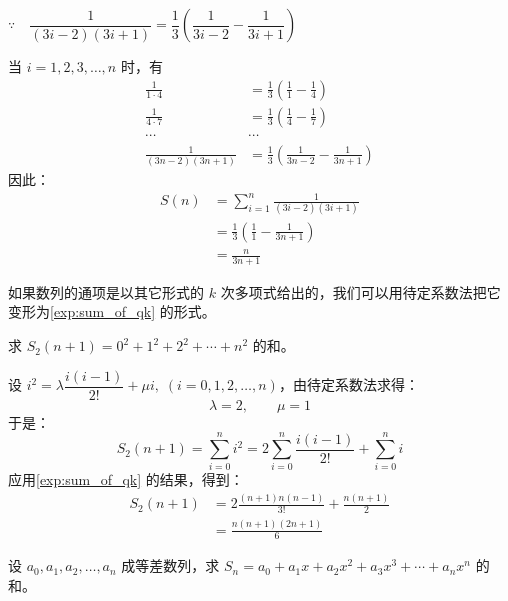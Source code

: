 \begin{solution}
$\because\quad \dfrac{1}{(3i-2)(3i+1)}=\dfrac{1}{3}\left(\dfrac{1}{3i-2}-\dfrac{1}{3i+1}\right)$

\bigskip 当 $i=1,2,3,\ldots,n$ 时，有
\[\begin{split}
    \frac{1}{1\cdot 4}&=\frac{1}{3}\left(\frac{1}{1}-\frac{1}{4}\right)\\
    \frac{1}{4\cdot 7}&=\frac{1}{3}\left(\frac{1}{4}-\frac{1}{7}\right)\\
    \cdots &\cdots\\
    \frac{1}{(3n-2)(3n+1)}&=\frac{1}{3}\left(\frac{1}{3n-2}-\frac{1}{3n+1}\right)
\end{split}\]
因此：
\[\begin{split}
    S(n)&=\sum^n_{i=1}\frac{1}{(3i-2)(3i+1)}\\
    &=\frac{1}{3}\left(\frac{1}{1}-\frac{1}{3n+1}\right)\\
    &=\frac{n}{3n+1}
\end{split}\]
\end{solution}

如果数列的通项是以其它形式的 $k$ 次多项式给出的，我们可以用待定系数法把它变形为\cref{exp:sum_of_qk} 的形式。


\begin{example}
  求 $S_2(n+1)=0^2+1^2+2^2+\cdots+n^2$ 的和。
\end{example}

\begin{solution}
  设 $i^2=\lambda \dfrac{i(i-1)}{2!}+\mu i,\; (i=0,1,2,\ldots,n)$，由待定系数法求得：
\[\lambda=2,\qquad \mu=1\]
于是：
\[S_2(n+1)=\sum^n_{i=0}i^2=2\sum^n_{i=0}\frac{i(i-1)}{2!}+\sum^n_{i=0}i\]
应用\cref{exp:sum_of_qk} 的结果，得到：
\[\begin{split}
    S_2(n+1)&=2\frac{(n+1)n(n-1)}{3!}+\frac{n(n+1)}{2}\\
    &=\frac{n(n+1)(2n+1)}{6}
\end{split}\]
\end{solution}

\begin{example}
设 $a_0,a_1,a_2,\ldots,a_n$ 成等差数列，求 $S_n=a_0+a_1x+a_2x^2+a_3x^3+\cdots+a_nx^n$ 的和。    
\end{example}

